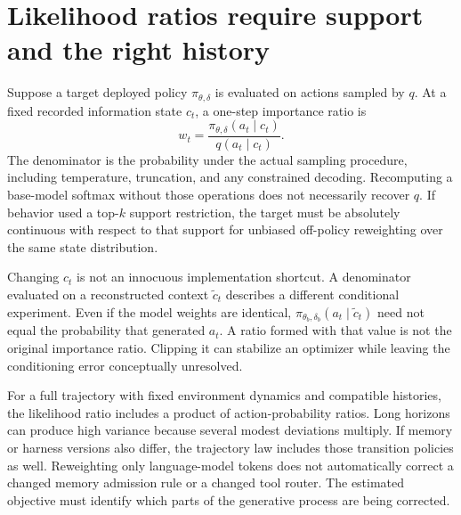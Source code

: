 \section{Likelihood ratios require support and the right history}\label{sec:C17:likelihood}
Suppose a target deployed policy $\pi_{\theta,\delta}$ is evaluated on actions sampled by $q$. At a fixed recorded information state $c_t$, a one-step importance ratio is
\begin{equation}
 w_t=\frac{\pi_{\theta,\delta}(a_t\mid c_t)}{q(a_t\mid c_t)}.
\end{equation}
The denominator is the probability under the actual sampling procedure, including temperature, truncation, and any constrained decoding. Recomputing a base-model softmax without those operations does not necessarily recover $q$. If behavior used a top-$k$ support restriction, the target must be absolutely continuous with respect to that support for unbiased off-policy reweighting over the same state distribution.

Changing $c_t$ is not an innocuous implementation shortcut. A denominator evaluated on a reconstructed context $\tilde c_t$ describes a different conditional experiment. Even if the model weights are identical, $\pi_{\theta_b,\delta_b}(a_t\mid\tilde c_t)$ need not equal the probability that generated $a_t$. A ratio formed with that value is not the original importance ratio. Clipping it can stabilize an optimizer while leaving the conditioning error conceptually unresolved.

For a full trajectory with fixed environment dynamics and compatible histories, the likelihood ratio includes a product of action-probability ratios. Long horizons can produce high variance because several modest deviations multiply. If memory or harness versions also differ, the trajectory law includes those transition policies as well. Reweighting only language-model tokens does not automatically correct a changed memory admission rule or a changed tool router. The estimated objective must identify which parts of the generative process are being corrected.

